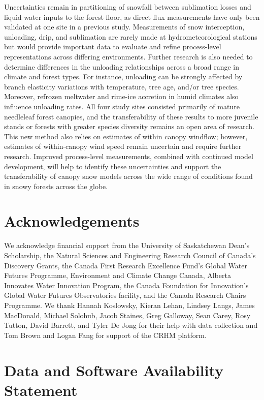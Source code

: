 \documentclass[
  letterpaper,
]{tex/uofsthesis-cs}
\begin{document}
Uncertainties remain in partitioning of snowfall between sublimation
losses and liquid water inputs to the forest floor, as direct flux
measurements have only been validated at one site in a previous study.
Measurements of snow interception, unloading, drip, and sublimation are
rarely made at hydrometeorological stations but would provide important
data to evaluate and refine process-level representations across
differing environments. Further research is also needed to determine
differences in the unloading relationships across a broad range in
climate and forest types. For instance, unloading can be strongly
affected by branch elasticity variations with temperature, tree age,
and/or tree species. Moreover, refrozen meltwater and rime-ice accretion
in humid climates also influence unloading rates. All four study sites
consisted primarily of mature needleleaf forest canopies, and the
transferability of these results to more juvenile stands or forests with
greater species diversity remains an open area of research. This new
method also relies on estimates of within canopy windflow; however,
estimates of within-canopy wind speed remain uncertain and require
further research. Improved process-level measurements, combined with
continued model development, will help to identify these uncertainties
and support the transferability of canopy snow models across the wide
range of conditions found in snowy forests across the globe.

\section{Acknowledgements}\label{acknowledgements-1}

We acknowledge financial support from the University of Saskatchewan
Dean's Scholarship, the Natural Sciences and Engineering Research
Council of Canada's Discovery Grants, the Canada First Research
Excellence Fund's Global Water Futures Programme, Environment and
Climate Change Canada, Alberta Innovates Water Innovation Program, the
Canada Foundation for Innovation's Global Water Futures Observatories
facility, and the Canada Research Chairs Programme. We thank Hannah
Koslowsky, Kieran Lehan, Lindsey Langs, James MacDonald, Michael
Solohub, Jacob Staines, Greg Galloway, Sean Carey, Rosy Tutton, David
Barrett, and Tyler De Jong for their help with data collection and Tom
Brown and Logan Fang for support of the CRHM platform.

\section{Data and Software Availability
Statement}\label{data-and-software-availability-statement}
\end{document}
